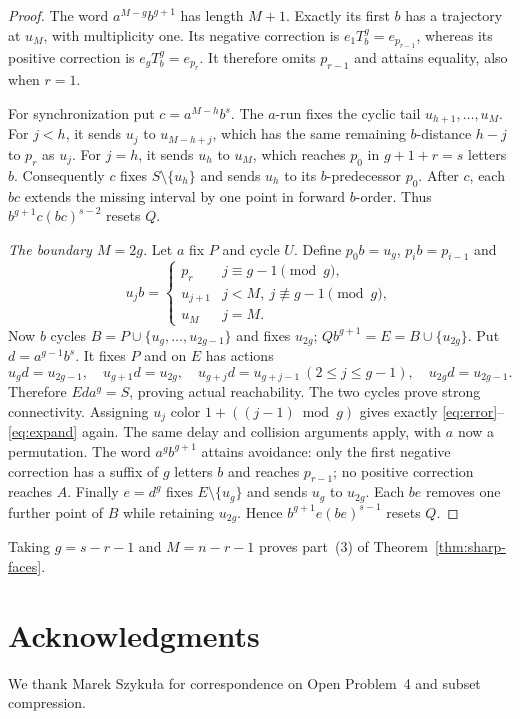 \documentclass[11pt]{article}
\theoremstyle{definition}
\theoremstyle{plain}
\begin{document}
\begin{proof}
The word $a^{M-g}b^{g+1}$ has length $M+1$.
Exactly its first $b$ has a trajectory at $u_M$, with multiplicity one.
Its negative correction is $e_1T_b^g=e_{p_{r-1}}$, whereas
its positive correction is $e_gT_b^g=e_{p_r}$.
It therefore omits $p_{r-1}$ and attains equality, also when $r=1$.

For synchronization put $c=a^{M-h}b^s$.
The $a$-run fixes the cyclic tail $u_{h+1},\ldots,u_M$.
For $j<h$, it sends $u_j$ to $u_{M-h+j}$, which has the same remaining
$b$-distance $h-j$ to $p_r$ as $u_j$.
For $j=h$, it sends $u_h$ to $u_M$, which reaches $p_0$ in $g+1+r=s$ letters $b$.
Consequently $c$ fixes $S\setminus\{u_h\}$ and sends $u_h$ to its $b$-predecessor $p_0$.
After $c$, each $bc$ extends the missing interval by one point in forward
$b$-order. Thus $b^{g+1}c(bc)^{s-2}$ resets $Q$.

\emph{The boundary $M=2g$.}
Let $a$ fix $P$ and cycle $U$.
Define $p_0b=u_g$, $p_ib=p_{i-1}$ and
\[
 u_jb=\begin{cases}
 p_r&j\equiv g-1\pmod g,\\
 u_{j+1}&j<M,\ j\not\equiv g-1\pmod g,\\
 u_M&j=M.
 \end{cases}
\]
Now $b$ cycles $B=P\cup\{u_g,\ldots,u_{2g-1}\}$ and fixes $u_{2g}$;
$Qb^{g+1}=E=B\cup\{u_{2g}\}$.
Put $d=a^{g-1}b^s$. It fixes $P$ and on $E$ has actions
\[
 u_gd=u_{2g-1},\quad u_{g+1}d=u_{2g},\quad
 u_{g+j}d=u_{g+j-1}\ (2\le j\le g-1),\quad u_{2g}d=u_{2g-1}.
\]
Therefore $Eda^g=S$, proving actual reachability. The two cycles prove strong connectivity.
Assigning $u_j$ color $1+((j-1)\bmod g)$ gives exactly
\eqref{eq:error}--\eqref{eq:expand} again.
The same delay and collision arguments apply, with $a$ now a permutation.
The word $a^gb^{g+1}$ attains avoidance: only the first negative correction
has a suffix of $g$ letters $b$ and reaches $p_{r-1}$; no positive correction reaches $A$.
Finally $e=d^g$ fixes $E\setminus\{u_g\}$ and sends $u_g$ to $u_{2g}$.
Each $be$ removes one further point of $B$ while retaining $u_{2g}$.
Hence $b^{g+1}e(be)^{s-1}$ resets $Q$.
\end{proof}
Taking $g=s-r-1$ and $M=n-r-1$ proves part~(3) of Theorem~\ref{thm:sharp-faces}.

\enlargethispage{2\baselineskip}
\section*{Acknowledgments}
We thank Marek Szyku\l a for correspondence on Open Problem~4 and subset compression.
\end{document}
